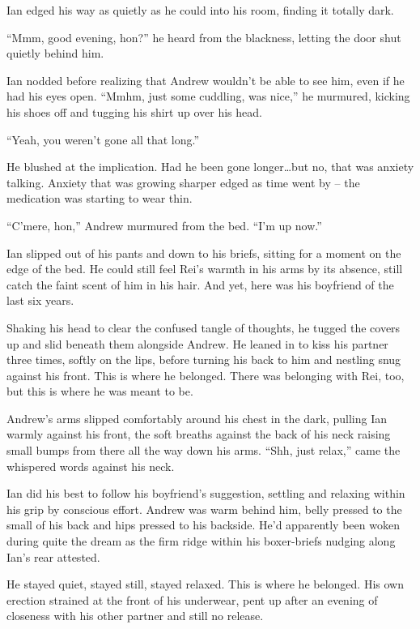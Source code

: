 \secdiv

Ian edged his way as quietly as he could into his room, finding it totally dark.

``Mmm, good evening, hon?'' he heard from the blackness, letting the door shut quietly behind him.

Ian nodded before realizing that Andrew wouldn't be able to see him, even if he had his eyes open. ``Mmhm, just some cuddling, was nice,'' he murmured, kicking his shoes off and tugging his shirt up over his head.

``Yeah, you weren't gone all that long.''

He blushed at the implication. Had he been gone longer\ldots{}but no, that was anxiety talking. Anxiety that was growing sharper edged as time went by -- the medication was starting to wear thin.

``C'mere, hon,'' Andrew murmured from the bed. ``I'm up now.''

Ian slipped out of his pants and down to his briefs, sitting for a moment on the edge of the bed. He could still feel Rei's warmth in his arms by its absence, still catch the faint scent of him in his hair. And yet, here was his boyfriend of the last six years.

Shaking his head to clear the confused tangle of thoughts, he tugged the covers up and slid beneath them alongside Andrew. He leaned in to kiss his partner three times, softly on the lips, before turning his back to him and nestling snug against his front. This is where he belonged. There was belonging with Rei, too, but this is where he was meant to be.

Andrew's arms slipped comfortably around his chest in the dark, pulling Ian warmly against his front, the soft breaths against the back of his neck raising small bumps from there all the way down his arms. ``Shh, just relax,'' came the whispered words against his neck.

Ian did his best to follow his boyfriend's suggestion, settling and relaxing within his grip by conscious effort. Andrew was warm behind him, belly pressed to the small of his back and hips pressed to his backside. He'd apparently been woken during quite the dream as the firm ridge within his boxer-briefs nudging along Ian's rear attested.

He stayed quiet, stayed still, stayed relaxed. This is where he belonged. His own erection strained at the front of his underwear, pent up after an evening of closeness with his other partner and still no release.

